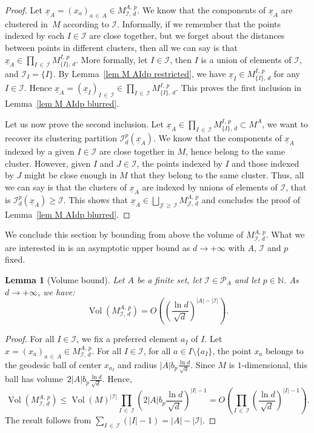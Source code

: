 \documentclass[10pt]{amsart}
\newtheorem{lemm}[theo]{Lemma}\newtheorem{prop}[theo]{Proposition}\newtheorem{coro}[theo]{Corollary}\newtheorem{conj}[theo]{Conjecture}
\theoremstyle{definition}\newtheorem{defi}[theo]{Definition}\newtheorem{rema}[theo]{Remark}\newtheorem{exam}[theo]{Example}\newtheorem{exem}[theo]{Example}\newtheorem{nota}[theo]{Notation}
\DeclareMathOperator{\Vol}{Vol}
\newcommand{\I}{\mathcal{I}}
\newcommand{\J}{\mathcal{J}}
\newcommand{\pa}{\mathcal{P}\!}
\newcommand{\N}{\mathbb{N}}
\newcommand{\norm}[1]{\left\lvert #1 \right\rvert}
\newcommand{\vol}[1]{\Vol\!\left(#1\right)}
\renewcommand{\geq}{\geqslant}
\renewcommand{\leq}{\leqslant}
\begin{document}
\begin{proof}
Let $\underline{x}_A= (x_a)_{a\,\in\,A} \in M^{A,\,p}_{\I,\,d}$. We know that the components of $\underline{x}_A$ are clustered in~$M$ according to $\I$. Informally, if we remember that the points indexed by each $I \in \I$ are close together, but we forget about the distances between points in different clusters, then all we can say is that $\underline{x}_A \in \prod_{I\,\in\,\I} M^{I,\,p}_{\{I\},\,d}$. More formally, let $I \in \I$, then $I$ is a union of elements of $\I$, and $\I_I = \{I\}$. By Lemma~\ref{lem M AIdp restricted}, we have $\underline{x}_I \in M^{I,\,p}_{\{I\},\,d}$ for any $I \in \I$. Hence $\underline{x}_A =(\underline{x}_I)_{I\,\in\,\I} \in \prod_{I\,\in\,\I} M^{I,\,p}_{\{I\},\,d}$. This proves the first inclusion in Lemma~\ref{lem M AIdp blurred}.

Let us now prove the second inclusion. Let $\underline{x}_A \in \prod_{I\,\in\,\I} M^{I,\,p}_{\{I\},\,d} \subset M^A$, we want to recover its clustering partition $\I_d^p(\underline{x}_A)$. We know that the components of $\underline{x}_A$ indexed by a given $I \in \I$ are close together in $M$, hence belong to the same cluster. However, given $I$ and $J \in \I$, the points indexed by $I$ and those indexed by $J$ might be close enough in $M$ that they belong to the same cluster. Thus, all we can say is that the clusters of $\underline{x}_A$ are indexed by unions of elements of $\I$, that is $\I_d^p(\underline{x}_A) \geq \I$. This shows that $\underline{x}_A \in \bigsqcup_{\J\, \geq\,\I} M^{A,\,p}_{\J,\,d}$ and concludes the proof of Lemma~\ref{lem M AIdp blurred}.
\end{proof}

We conclude this section by bounding from above the volume of $M^{A,\,p}_{\I,\,d}$. What we are interested in is an asymptotic upper bound as $d \to +\infty$ with $A$, $\I$ and $p$ fixed.

\begin{lemm}[{Volume bound}]\label{lem volume M AIdp}
Let $A$ be a finite set, let $\I \in \pa_A$ and let $p \in \N$. As $d \to +\infty$, we have:
\[
\vol{M^{A,\,p}_{\I,\,d}} = O\!\left(\left(\frac{\ln d}{\sqrt{d}}\right)^{\norm{A}-\norm{\I}}\right).
\]
\end{lemm}

\begin{proof}
For all $I \in \I$, we fix a preferred element $a_I$ of $I$. Let $x = (x_a)_{a\,\in\,A} \in M^{A,\,p}_{\I,\,d}$. For all $I \in \I$, for all $a \in I \setminus \{a_I\}$, the point $x_a$ belongs to the geodesic ball of center $x_{a_I}$ and radius $|A| b_p \frac{\ln d}{\sqrt{d}}$. Since $M$ is $1$-dimensional, this ball has volume~$2|A| b_p \frac{\ln d}{\sqrt{d}}$. Hence,
\[
\vol{M^{A,\,p}_{\I,\,d}} \leq \vol{M}^{\norm{\I}} \prod_{I\,\in \,\I} \left(2\norm{A}b_p \frac{\ln d}{\sqrt{d}}\right)^{\norm{I}-1} = O\!\left(\prod_{I\,\in\,\I}\left(\frac{\ln d}{\sqrt{d}}\right)^{\norm{I}-1}\right).
\]
The result follows from $\sum_{I\,\in\,\I} (|I|-1) = |A|-|\I|$.
\end{proof}
\end{document}
